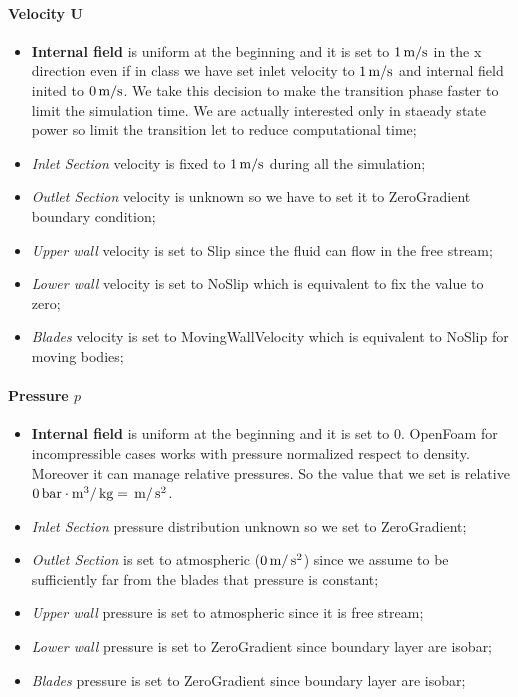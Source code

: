 \documentclass[a4paper,12pt]{article}
\begin{document}
\paragraph{Velocity U}
\begin{itemize}
\item \textbf{Internal field} is uniform at the beginning and it is set to $1\,\text{m}/\text{s}$ in the x direction even if in class we have set inlet velocity to $1\,\text{m}/\text{s}$ and internal field inited to $0\,\text{m}/\text{s}$. We take this decision to make the transition phase faster to limit the simulation time. We are actually interested only in staeady state power so limit the transition let to reduce computational time;
\item \emph{Inlet Section} velocity is fixed to $1\,\text{m}/\text{s}$ during all the simulation; 
\item \emph{Outlet Section} velocity is unknown so we have to set it to ZeroGradient boundary condition;
\item \emph{Upper wall} velocity is set to Slip since the fluid can flow in the free stream;
\item \emph{Lower wall} velocity is set to NoSlip which is equivalent to fix the value to zero;
\item \emph{Blades} velocity is set to MovingWallVelocity which is equivalent to NoSlip for moving bodies;
\end{itemize}

\paragraph{Pressure $p$}
\begin{itemize}
\item \textbf{Internal field} is uniform at the beginning and it is set to $0$. 
OpenFoam for incompressible cases works with pressure normalized respect to density. 
Moreover it can manage relative pressures. 
So the value that we set is relative $0 \,\text{bar} \cdot \text{m}^3 / \,\text{kg} = \,\text{m} / \,\text{s}^2$.
\item \emph{Inlet Section} pressure distribution unknown so we set to ZeroGradient; 
\item \emph{Outlet Section} is set to atmospheric ($0 \,\text{m} / \,\text{s}^2$) since we assume to be sufficiently far from the blades that pressure is constant;
\item \emph{Upper wall} pressure is set to atmospheric since it is free stream;
\item \emph{Lower wall} pressure is set to ZeroGradient since boundary layer are isobar;
\item \emph{Blades} pressure is set to ZeroGradient since boundary layer are isobar;
\end{itemize}
\end{document}
